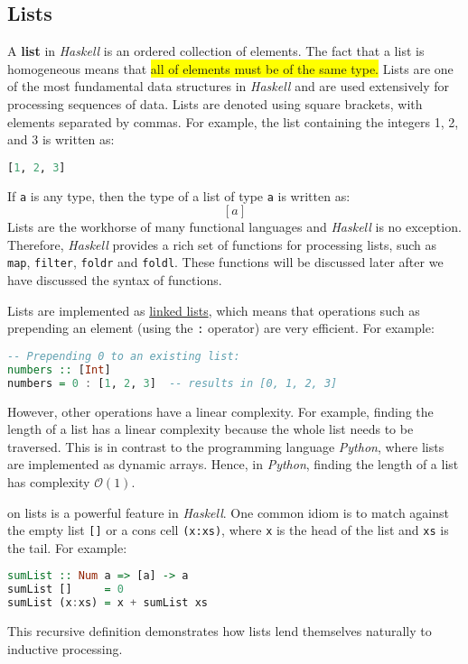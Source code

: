 \subsection{Lists}
A \textbf{list} in \textsl{Haskell} is an  ordered collection of elements.  The fact that a list is
homogeneous means that \colorbox{yellow}{all of elements must be of the same type.} Lists are one of the most
fundamental data structures in \textsl{Haskell} and are used extensively for 
processing sequences of data. Lists are denoted using square brackets, with elements separated by commas. For
example, the list containing the integers 1, 2, and 3 is written as: 
\begin{lstlisting}[style=haskellstyle, language=Haskell]
[1, 2, 3]
\end{lstlisting}
If \texttt{a} is any type, then the type of a list of type \texttt{a} is written as:
\[
[ a ]
\]
Lists are the workhorse of many functional languages and \textsl{Haskell} is no exception.  Therefore, \textsl{Haskell}
provides a rich set of functions for processing lists, such as \texttt{map}, \texttt{filter}, 
\texttt{foldr} and \texttt{foldl}.  These functions will be discussed later after we have discussed the syntax
of functions.

Lists are implemented as \href{https://en.wikipedia.org/wiki/Linked_list}{linked lists}, which means that
operations such as prepending an element (using the \texttt{:} operator) are very efficient. For example: 
\begin{lstlisting}[style=haskellstyle, language=Haskell]
-- Prepending 0 to an existing list:
numbers :: [Int]
numbers = 0 : [1, 2, 3]  -- results in [0, 1, 2, 3]
\end{lstlisting}
However, other operations have a linear complexity.  For example, finding the length of a list has a linear
complexity because the whole list needs to be traversed.  This is in contrast to the programming language
\textsl{Python}, where lists are implemented as dynamic arrays.  Hence, in \textsl{Python}, finding the length of a list
has complexity $\mathcal{O}(1)$.

 on lists is a powerful feature in \textsl{Haskell}. One common idiom is to match against the
empty list \texttt{[]} or a cons cell \texttt{(x:xs)}, where \texttt{x} is the head of the list and \texttt{xs}
is the tail. For example: 
\begin{lstlisting}[style=haskellstyle, language=Haskell]
sumList :: Num a => [a] -> a
sumList []     = 0
sumList (x:xs) = x + sumList xs
\end{lstlisting}
This recursive definition demonstrates how lists lend themselves naturally to inductive processing.

